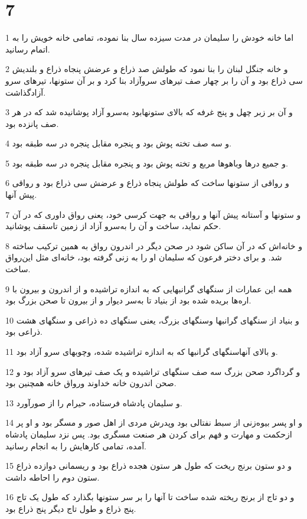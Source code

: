 \chapter{7}

\par 1 اما خانه خودش را سلیمان در مدت سیزده سال بنا نموده، تمامی خانه خویش را به اتمام رسانید.
\par 2 و خانه جنگل لبنان را بنا نمود که طولش صد ذراع و عرضش پنجاه ذراع و بلندیش سی ذراع بود و آن را بر چهار صف تیرهای سروآزاد بنا کرد و بر آن ستونها، تیرهای سرو آزادگذاشت.
\par 3 و آن بر زبر چهل و پنج غرفه که بالای ستونهابود به‌سرو آزاد پوشانیده شد که در هر صف پانزده بود.
\par 4 و سه صف تخته پوش بود و پنجره مقابل پنجره در سه طبقه بود.
\par 5 و جمیع درها وباهوها مربع و تخته پوش بود و پنجره مقابل پنجره در سه طبقه بود.
\par 6 و رواقی از ستونها ساخت که طولش پنجاه ذراع و عرضش سی ذراع بود و رواقی پیش آنها.
\par 7 و ستونها و آستانه پیش آنها و رواقی به جهت کرسی خود، یعنی رواق داوری که در آن حکم نماید، ساخت و آن را به‌سرو آزاد از زمین تاسقف پوشانید.
\par 8 و خانه‌اش که در آن ساکن شود در صحن دیگر در اندرون رواق به همین ترکیب ساخته شد. و برای دختر فرعون که سلیمان او را به زنی گرفته بود، خانه‌ای مثل این‌رواق ساخت.
\par 9 همه این عمارات از سنگهای گرانبهایی که به اندازه تراشیده و از اندرون و بیرون با اره‌ها بریده شده بود از بنیاد تا به‌سر دیوار و از بیرون تا صحن بزرگ بود.
\par 10 و بنیاد از سنگهای گرانبها وسنگهای بزرگ، یعنی سنگهای ده ذراعی و سنگهای هشت ذراعی بود.
\par 11 و بالای آنهاسنگهای گرانبها که به اندازه تراشیده شده، وچوبهای سرو آزاد بود.
\par 12 و گرداگرد صحن بزرگ سه صف سنگهای تراشیده و یک صف تیرهای سرو آزاد بود و صحن اندرون خانه خداوند ورواق خانه همچنین بود.
\par 13 و سلیمان پادشاه فرستاده، حیرام را از صورآورد.
\par 14 و او پسر بیوه‌زنی از سبط نفتالی بود وپدرش مردی از اهل صور و مسگر بود و او پر ازحکمت و مهارت و فهم برای کردن هر صنعت مسگری بود. پس نزد سلیمان پادشاه آمده، تمامی کارهایش را به انجام رسانید.
\par 15 و دو ستون برنج ریخت که طول هر ستون هجده ذراع بود و ریسمانی دوازده ذراع ستون دوم را احاطه داشت.
\par 16 و دو تاج از برنج ریخته شده ساخت تا آنها را بر سر ستونها بگذارد که طول یک تاج پنج ذراع و طول تاج دیگر پنج ذراع بود.

